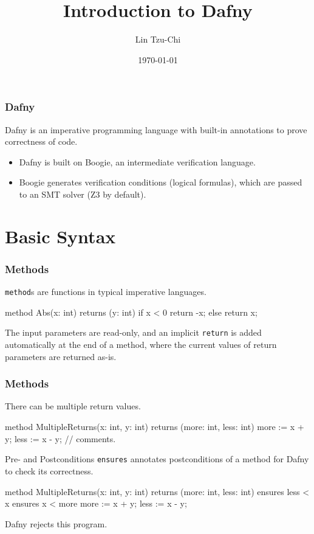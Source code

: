 \documentclass[10pt, compress]{beamer}
\title{Introduction to Dafny}
\subtitle{}
\date{\today}
\author{Lin Tzu-Chi}
\begin{document}
\maketitle

\begin{frame}[fragile]
  \frametitle{Dafny}

  Dafny is an imperative programming language with built-in annotations to prove correctness of code.
  \begin{itemize}
  \item Dafny is built on Boogie, an intermediate verification language.
  \item Boogie generates verification conditions (logical formulas), which are passed to an SMT solver (Z3 by default).
  \end{itemize}
  
\end{frame}

\section{Basic Syntax}

\begin{frame}[fragile]
  \frametitle{Methods}
  
  \verb|method|s are functions in typical imperative languages.
  
  \begin{verbnobox}[\footnotesize]
method Abs(x: int) returns (y: int)
{
   if x < 0
     { return -x; }
   else
     { return x; }
}
  \end{verbnobox}
  The input parameters are read-only, and an implicit \verb|return| is added automatically at the end of a method, where the current values of return parameters are returned as-is.
\end{frame}

\begin{frame}[fragile]
  \frametitle{Methods}
  
  There can be multiple return values.
  \begin{verbnobox}[\footnotesize]
method MultipleReturns(x: int, y: int)
returns (more: int, less: int)
{
   more := x + y;
   less := x - y;
   // comments.
}
  \end{verbnobox}
\end{frame}

\begin{frame}[fragile]{Pre- and Postconditions}
  \verb|ensures| annotates postconditions of a method for Dafny to check its correctness. 
  \begin{verbnobox}[\footnotesize]
method MultipleReturns(x: int, y: int)
returns (more: int, less: int)
   ensures less < x
   ensures x < more
{
   more := x + y;
   less := x - y;
}
  \end{verbnobox}	
  
Dafny rejects this program.
\end{frame}
\end{document}
